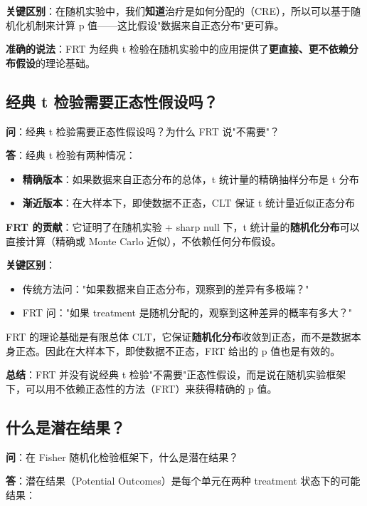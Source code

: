 \textbf{关键区别}：在随机实验中，我们\textbf{知道}治疗是如何分配的（CRE），所以可以基于随机化机制来计算 p 值——这比假设"数据来自正态分布"更可靠。

\textbf{准确的说法}：FRT 为经典 t 检验在随机实验中的应用提供了\textbf{更直接、更不依赖分布假设}的理论基础。

\subsection{经典 t 检验需要正态性假设吗？}\label{sec:qa-t-test-normality}

\textbf{问}：经典 t 检验需要正态性假设吗？为什么 FRT 说"不需要"？

\textbf{答}：经典 t 检验有两种情况：

\begin{itemize}
  \item \textbf{精确版本}：如果数据来自正态分布的总体，t 统计量的精确抽样分布是 t 分布
  \item \textbf{渐近版本}：在大样本下，即使数据不正态，CLT 保证 t 统计量近似正态分布
\end{itemize}

\textbf{FRT 的贡献}：它证明了在随机实验 + sharp null 下，t 统计量的\textbf{随机化分布}可以直接计算（精确或 Monte Carlo 近似），不依赖任何分布假设。

\textbf{关键区别}：
\begin{itemize}
  \item 传统方法问："如果数据来自正态分布，观察到的差异有多极端？"
  \item FRT 问："如果 treatment 是随机分配的，观察到这种差异的概率有多大？"
\end{itemize}

FRT 的理论基础是有限总体 CLT，它保证\textbf{随机化分布}收敛到正态，而不是数据本身正态。因此在大样本下，即使数据不正态，FRT 给出的 p 值也是有效的。

\textbf{总结}：FRT 并没有说经典 t 检验"不需要"正态性假设，而是说在随机实验框架下，可以用不依赖正态性的方法（FRT）来获得精确的 p 值。

\subsection{什么是潜在结果？}\label{sec:qa-potential-outcomes}

\textbf{问}：在 Fisher 随机化检验框架下，什么是潜在结果？

\textbf{答}：潜在结果（Potential Outcomes）是每个单元在两种 treatment 状态下的可能结果：

